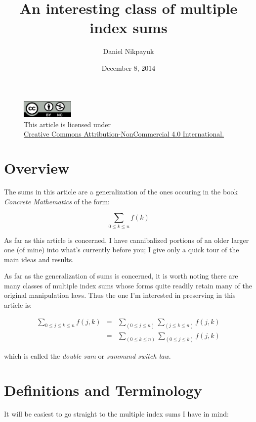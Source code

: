 \documentclass[twoside]{amsart}
\title{An interesting class of multiple index sums}
\author{Daniel Nikpayuk}
\date{December 8, 2014}
\begin{document}
\maketitle

\begin{figure}[h]
\centering
\includegraphics[width=1in]{cc-by-nc.png}\\[0.1in]
\tiny This article is licensed under \\
\href{http://creativecommons.org/licenses/by-nc/4.0/}
{Creative Commons Attribution-NonCommercial 4.0 International.}\\[0.3in]
\end{figure}

\section{Overview}

The sums in this article are a generalization of the ones occuring
in the book \emph{Concrete Mathematics} \cite{gkp} of the form:

$$ \sum_{0\le k\le n}f(k) $$

As far as this article is concerned, I have cannibalized portions of an older larger one (of mine)
into what's currently before you; I give only a quick tour of the main ideas and results.

As far as the generalization of sums is concerned, it is worth noting there are many
classes of multiple index sums whose forms quite readily retain many of the original
manipulation laws.  Thus the one I'm interested in preserving in this article is:

\begin{eqnarray*}
\sum_{0\le j\le k\le n}f(j,k)
 & = & \sum_{(0\le j\le n)}\sum_{(j\le k\le n)}f(j,k) \\  
 & = & \sum_{(0\le k\le n)}\sum_{(0\le j\le k)}f(j,k)       
\end{eqnarray*}

which is called the \emph{double sum} or \emph{summand switch law}.

\section{Definitions and Terminology}

It will be easiest to go straight to the multiple index sums I have in mind:
\end{document}
